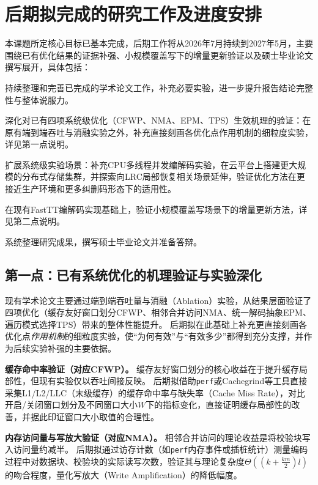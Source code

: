 \section{后期拟完成的研究工作及进度安排}

本课题所定核心目标已基本完成，后期工作将从2026年7月持续到2027年5月，主要围绕已有优化结果的证据补强、小规模覆盖写下的增量更新验证以及硕士毕业论文撰写展开，具体包括：
\begin{semiQuotList}
    \item 持续整理和完善已完成的学术论文工作，补充必要实验，进一步提升报告结论完整性与整体说服力。
    \item 深化对已有四项系统级优化（CFWP、NMA、EPM、TPS）生效机理的验证：在原有端到端吞吐与消融实验之外，补充直接刻画各优化点作用机制的细粒度实验，详见第一点说明。
    \item 扩展系统级实验场景：补充CPU多线程并发编解码实验，在云平台上搭建更大规模的分布式存储集群，并探索向LRC局部恢复相关场景延伸，验证优化方法在更接近生产环境和更多纠删码形态下的适用性。
    \item 在现有FastTT编解码实现基础上，验证小规模覆盖写场景下的增量更新方法，详见第二点说明。
    \item 系统整理研究成果，撰写硕士毕业论文并准备答辩。
\end{semiQuotList}

\subsection{第一点：已有系统优化的机理验证与实验深化}

现有学术论文主要通过端到端吞吐量与消融（Ablation）实验，从结果层面验证了四项优化（缓存友好窗口划分CFWP、相邻合并访问NMA、统一解码抽象EPM、遍历模式选择TPS）带来的整体性能提升。
后期拟在此基础上补充更直接刻画各优化点\emph{作用机制}的细粒度实验，使“为何有效”与“有效多少”都得到充分支撑，并作为后续实验补强的主要依据。

\textbf{缓存命中率验证（对应CFWP）。}
缓存友好窗口划分的核心收益在于提升缓存局部性，但现有实验仅以吞吐间接反映。
后期拟借助\texttt{perf}或Cachegrind等工具直接采集L1/L2/LLC（末级缓存）的缓存命中率与缺失率（Cache Miss Rate），对比开启/关闭窗口划分及不同窗口大小$W$下的指标变化，直接证明缓存局部性的改善，并据此印证窗口大小取值的合理性。

\textbf{内存访问量与写放大验证（对应NMA）。}
相邻合并访问的理论收益是将校验块写入访问量约减半。
后期拟通过访存计数（如\texttt{perf}内存事件或插桩统计）测量编码过程中对数据块、校验块的实际读写次数，验证其与理论复杂度$\Theta((k+\tfrac{km}{2})l)$的吻合程度，量化写放大（Write Amplification）的降低幅度。

